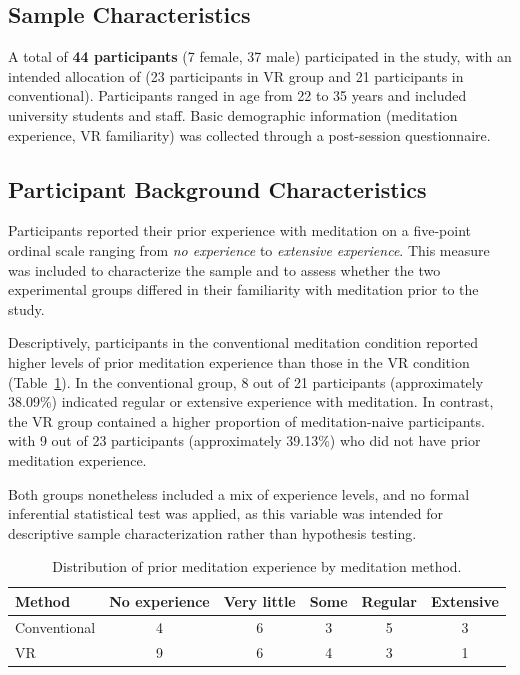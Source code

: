 \subsection{Sample Characteristics}
A total of \textbf{44 participants} (7 female, 37 male) participated in the study, with an intended allocation of (23 participants in VR group and 21 participants in conventional). Participants ranged in age from 22 to 35 years and included university students and staff. Basic demographic information (meditation experience, VR familiarity) was collected through a post-session questionnaire.

\subsection{Participant Background Characteristics}

Participants reported their prior experience with meditation on a
five-point ordinal scale ranging from \textit{no experience} to
\textit{extensive experience}. This measure was included to
characterize the sample and to assess whether the two experimental
groups differed in their familiarity with meditation prior to the
study.

Descriptively, participants in the conventional meditation condition
reported higher levels of prior meditation experience than those in the
VR condition (Table~\ref{tab:meditation-experience}). In the conventional
group, 8 out of 21 participants (approximately 38.09\%) indicated regular
or extensive experience with meditation. In contrast, the VR group
contained a higher proportion of meditation-naive participants. with
9 out of 23 participants (approximately 39.13\%) who did not have prior
meditation experience.

Both groups nonetheless included a mix of experience levels, and no
formal inferential statistical test was applied, as this variable was
intended for descriptive sample characterization rather than hypothesis
testing.

\begin{table}[H]
\centering
\caption{Distribution of prior meditation experience by meditation method.}
\label{tab:meditation-experience}
\begin{tabular}{lccccc}
\toprule
\textbf{Method} & \textbf{No experience} & \textbf{Very little} & \textbf{Some} & \textbf{Regular} & \textbf{Extensive} \\
\midrule
Conventional & 4 & 6 & 3 & 5 & 3 \\
VR           & 9 & 6 & 4 & 3 & 1 \\
\bottomrule
\end{tabular}
\end{table}



